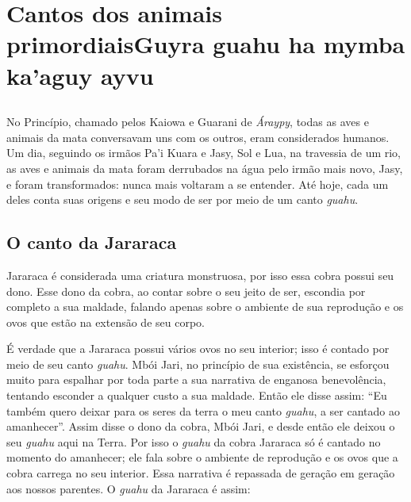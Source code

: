 \part{Cantos dos animais primordiais\break Guyra guahu ha mymba ka'aguy ayvu}

\chapter*{}
\thispagestyle{empty}
\vspace*{\fill}
No Princípio, chamado pelos Kaiowa e Guarani de \emph{Áraypy}, todas as
aves e animais da mata conversavam uns com os outros, eram considerados
humanos. Um dia, seguindo os irmãos Pa'i Kuara e Jasy, Sol e Lua, na
travessia de um rio, as aves e animais da mata foram derrubados na água
pelo irmão mais novo, Jasy, e foram transformados: nunca mais voltaram a
se entender. Até hoje, cada um deles conta suas origens e seu modo de
ser por meio de um canto \emph{guahu}.
\vspace*{\fill}

\chapter{O canto da Jararaca}

 Jararaca é considerada uma criatura monstruosa, por isso essa cobra
possui seu dono. Esse dono da cobra, ao contar sobre o seu jeito de ser,
escondia por completo a sua maldade, falando apenas sobre o ambiente de
sua reprodução e os ovos que estão na extensão de seu corpo.

É verdade que a Jararaca possui vários ovos no seu interior; isso é
contado por meio de seu canto \emph{guahu}. Mbói Jari, no princípio de
sua existência, se esforçou muito para espalhar por toda parte a sua
narrativa de enganosa benevolência, tentando esconder a qualquer custo a
sua maldade. Então ele disse assim: ``Eu também quero deixar para os
seres da terra o meu canto \emph{guahu}, a ser cantado ao amanhecer''.
Assim disse o dono da cobra, Mbói Jari, e desde então ele deixou o seu
\emph{guahu} aqui na Terra. Por isso o \emph{guahu} da cobra Jararaca só
é cantado no momento do amanhecer; ele fala sobre o ambiente de
reprodução e os ovos que a cobra carrega no seu interior. Essa narrativa
é repassada de geração em geração aos nossos parentes. O \emph{guahu} da
Jararaca é assim:

